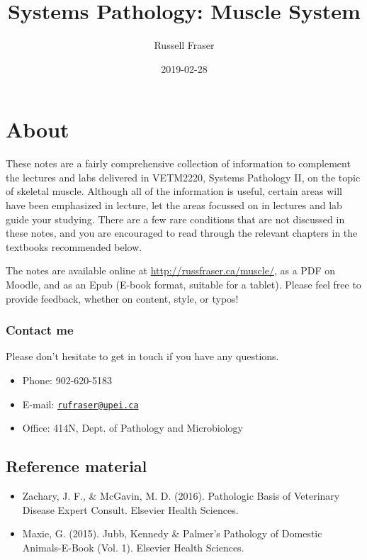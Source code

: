 \documentclass[openany]{book}
\title{Systems Pathology: Muscle System}
\author{Russell Fraser}
\date{2019-02-28}
\providecommand{\tightlist}{%
  \setlength{\itemsep}{0pt}\setlength{\parskip}{0pt}}
\begin{document}
\maketitle

{
\setcounter{tocdepth}{1}
\tableofcontents
}
\chapter*{About}\label{about}

These notes are a fairly comprehensive collection of information to
complement the lectures and labs delivered in VETM2220, Systems
Pathology II, on the topic of skeletal muscle. Although all of the
information is useful, certain areas will have been emphasized in
lecture, let the areas focussed on in lectures and lab guide your
studying. There are a few rare conditions that are not discussed in
these notes, and you are encouraged to read through the relevant
chapters in the textbooks recommended below.

The notes are available online at \url{http://russfraser.ca/muscle/}, as
a PDF on Moodle, and as an Epub (E-book format, suitable for a tablet).
Please feel free to provide feedback, whether on content, style, or
typos!

\subsection*{Contact me}\label{contact-me}

Please don't hesitate to get in touch if you have any questions.

\begin{itemize}
\tightlist
\item
  Phone: 902-620-5183
\item
  E-mail: \href{mailto:rufraser@upei.ca}{\nolinkurl{rufraser@upei.ca}}
\item
  Office: 414N, Dept. of Pathology and Microbiology
\end{itemize}

\section*{Reference material}\label{reference-material}

\begin{itemize}
\tightlist
\item
  Zachary, J. F., \& McGavin, M. D. (2016). Pathologic Basis of
  Veterinary Disease Expert Consult. Elsevier Health Sciences.
\item
  Maxie, G. (2015). Jubb, Kennedy \& Palmer's Pathology of Domestic
  Animals-E-Book (Vol. 1). Elsevier Health Sciences.
\end{itemize}
\end{document}
